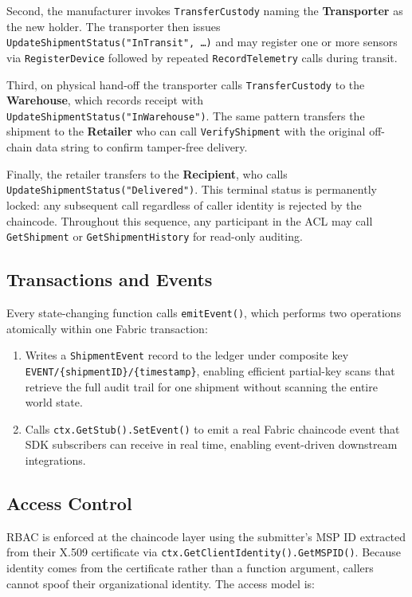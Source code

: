 \documentclass[conference]{IEEEtran}
\begin{document}
Second, the manufacturer invokes \texttt{TransferCustody} naming the
\textbf{Transporter} as the new holder.  The transporter then issues
\texttt{UpdateShipmentStatus("InTransit", \ldots)} and may register one or
more sensors via \texttt{RegisterDevice} followed by repeated
\texttt{RecordTelemetry} calls during transit.

Third, on physical hand-off the transporter calls \texttt{TransferCustody}
to the \textbf{Warehouse}, which records receipt with
\texttt{UpdateShipmentStatus("InWarehouse")}.  The same pattern transfers
the shipment to the \textbf{Retailer} who can call \texttt{VerifyShipment}
with the original off-chain data string to confirm tamper-free delivery.

Finally, the retailer transfers to the \textbf{Recipient}, who calls
\texttt{UpdateShipmentStatus("Delivered")}.  This terminal status is
permanently locked: any subsequent call  regardless of caller identity
 is rejected by the chaincode.  Throughout this sequence, any
participant in the ACL may call \texttt{GetShipment} or
\texttt{GetShipmentHistory} for read-only auditing.

\subsection{Transactions and Events}

Every state-changing function calls \texttt{emitEvent()}, which performs two
operations atomically within one Fabric transaction:

\begin{enumerate}
  \item Writes a \texttt{ShipmentEvent} record to the ledger under composite
    key \texttt{EVENT/\{shipmentID\}/\{timestamp\}}, enabling efficient
    partial-key scans that retrieve the full audit trail for one shipment
    without scanning the entire world state.
  \item Calls \texttt{ctx.GetStub().SetEvent()} to emit a real Fabric
    chaincode event that SDK subscribers can receive in real time, enabling
    event-driven downstream integrations.
\end{enumerate}

\subsection{Access Control}
\label{sec:access}

RBAC is enforced at the chaincode layer using the submitter's MSP ID
extracted from their X.509 certificate via
\texttt{ctx.GetClientIdentity().GetMSPID()}.  Because identity comes from
the certificate rather than a function argument, callers cannot spoof their
organizational identity.  The access model is:
\end{document}
